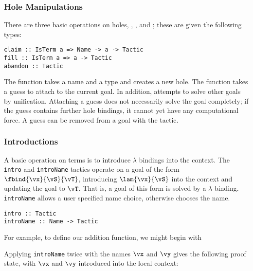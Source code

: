 \subsubsection{Hole Manipulations}
There are three basic operations on holes, , ,
and ; these are given the following types:
%
\begin{verbatim}
claim :: IsTerm a => Name -> a -> Tactic
fill :: IsTerm a => a -> Tactic
abandon :: Tactic
\end{verbatim}
%
The  function takes a name and a type and creates a new
hole. The  function takes a guess to attach to the current
goal. In addition,  attempts to solve other goals by
unification. Attaching a guess does not necessarily solve the goal
completely; if the guess contains further hole bindings, it cannot yet
have any computational force.
A guess can be removed from a goal with the 
tactic.


\subsubsection{Introductions}
A basic operation on terms is to introduce $\lambda$ bindings into the
context. The \texttt{intro} and \texttt{introName} tactics operate on
a goal of the form $\fbind{\vx}{\vS}{\vT}$, introducing
$\lam{\vx}{\vS}$ into the context and updating the goal to
$\vT$. That is, a goal of this form is solved by a $\lambda$-binding.
\texttt{introName} allows a user specified name choice,
otherwise \Ivor{} chooses the name.
%
\begin{verbatim}
intro :: Tactic
introName :: Name -> Tactic
\end{verbatim}
%
For example, to define our addition function, we might begin with


Applying \texttt{introName} twice with the names $\vx$ and $\vy$ gives
the following proof state, with $\vx$ and $\vy$ introduced into the
local context:


